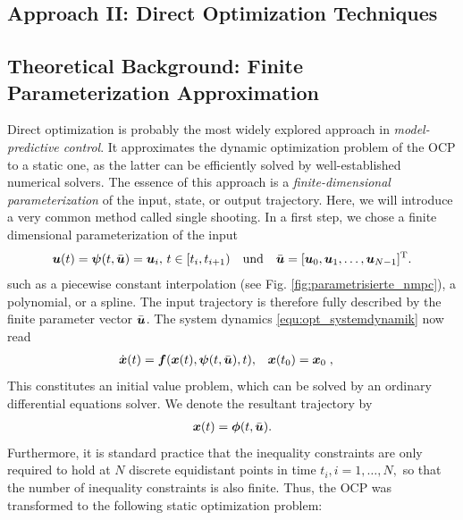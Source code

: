 \subsection{Approach II: Direct Optimization Techniques}\label{S:57.3.2}


\subsection{	Theoretical Background: Finite Parameterization Approximation}\label{S:57.3.2.1}
Direct optimization is probably the most widely explored approach in \textit{model-predictive control}. It approximates the dynamic optimization problem of the OCP to a static one, as the latter can be efficiently solved by well-established numerical solvers. The essence of this approach is a \textit{finite-dimensional parameterization} of the input, state, or output trajectory.
Here, we will introduce a very common method called single shooting. In a first step, we chose a finite dimensional parameterization of the input
\begin{align*}
	\boldsymbol{u}(t) = \boldsymbol{\psi}(t,\bar{\boldsymbol{u}}) = \boldsymbol{u}_i, \, t\in[t_i, t_{i+1}) \quad \text{und} \quad \bar{\boldsymbol{u}} = [\boldsymbol{u}_0, \boldsymbol{u}_1, \ldots, \boldsymbol{u}_{N-1}]^{{\rm T}}.
\end{align*}
such as a piecewise constant interpolation (see  Fig. \ref{fig:parametrisierte_nmpc}), a polynomial, or a spline. The input trajectory is therefore fully described by the finite parameter vector $\bar{\boldsymbol{u}}$. The system dynamics \eqref{equ:opt_systemdynamik} now read
\begin{align*}
	\dot{\boldsymbol{x}}(t) = \boldsymbol{f}(\boldsymbol{x}(t),\boldsymbol{\psi}(t,\bar{\boldsymbol{u}}),t), \quad &\boldsymbol{x}(t_0) = \boldsymbol{x}_0\; , 
\end{align*}
This constitutes an initial value problem, which can be solved by an ordinary differential equations solver. We denote the resultant trajectory by 
\begin{align*}
\boldsymbol{x}(t) = \boldsymbol{\phi}(t,\bar{\boldsymbol{u}}).
\end{align*}
Furthermore, it is standard practice that the inequality constraints are only required to hold at $N$ discrete equidistant points in time $t_i,i=1,\dots,N,$ so that the number of inequality constraints is also finite. 
Thus, the OCP was transformed to the following static optimization problem:

